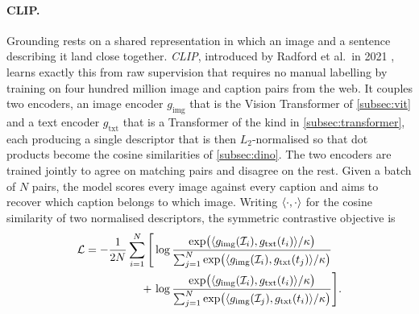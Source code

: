 \paragraph{CLIP.} Grounding rests on a shared representation in which an image and a sentence describing it land close together. \textit{CLIP}, introduced by Radford et al.\ in 2021 \cite{radford2021clip}, learns exactly this from raw supervision that requires no manual labelling by training on four hundred million image and caption pairs from the web. It couples two encoders, an image encoder $g_\text{img}$ that is the Vision Transformer of \cref{subsec:vit} and a text encoder $g_\text{txt}$ that is a Transformer of the kind in \cref{subsec:transformer}, each producing a single descriptor that is then
$L_2$-normalised so that dot products become the cosine similarities of \cref{subsec:dino}.
The two encoders are trained jointly to agree on matching pairs and disagree on the rest. Given a batch of $N$ pairs, the model scores every image against every caption and aims to recover which caption belongs to which image. Writing $\langle \cdot, \cdot\rangle$ for the cosine similarity of two normalised descriptors, the symmetric contrastive objective is
\begin{equation}
  \begin{split}
  \mathcal{L}
  = -\frac{1}{2N}\sum_{i=1}^{N}
    \Bigg[
      &\log\frac{\exp\!\big(\langle g_\text{img}(\mathcal{I}_i), g_\text{txt}(t_i)\rangle/\kappa\big)}
               {\sum_{j=1}^{N}\exp\!\big(\langle g_\text{img}(\mathcal{I}_i), g_\text{txt}(t_j)\rangle/\kappa\big)}
      \\
      +\,&\log\frac{\exp\!\big(\langle g_\text{img}(\mathcal{I}_i), g_\text{txt}(t_i)\rangle/\kappa\big)}
               {\sum_{j=1}^{N}\exp\!\big(\langle g_\text{img}(\mathcal{I}_j), g_\text{txt}(t_i)\rangle/\kappa\big)}
    \Bigg].
  \end{split}
  \label{eq:clip-infonce}
\end{equation}

